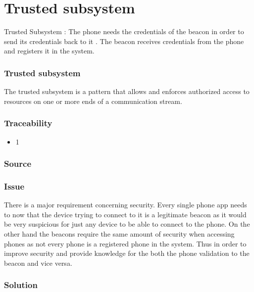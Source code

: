 

\section{Trusted subsystem}

Trusted Subsystem : The phone needs the credentials of the beacon in order to send its credentials back to it . The beacon receives credentials from the phone and registers it in the system. 
	
	\subsubsection{Trusted subsystem}
	The trusted subsystem is a pattern that allows and enforces authorized access to resources on one or more ends of a communication stream.


	\subsubsection{Traceability} 
		\begin{itemize}
			\item 1
		\end{itemize}

	\subsubsection{Source} \cite{book:design-patterns}

	\subsubsection{Issue} \label{trustedP:issue}

		There is a major requirement concerning security. Every single phone app needs to now that the device trying to connect to it is a legitimate beacon as it would be very suspicious for just any device to be able to connect to the phone. On the other hand the beacons require the same amount of security when accessing phones as not every phone is a registered phone in the system. Thus in order to improve security and provide knowledge for the both the phone validation to the beacon and vice versa.


	\subsubsection{Solution} 

